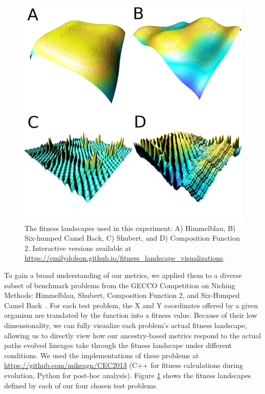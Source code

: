 \documentclass[letterpaper]{article}
\newcommand{\reduceCaptionPadding}{\setlength{\belowcaptionskip}{-10pt}}
\begin{document}
\begin{figure}
\includegraphics[width=\columnwidth]{figs/landscapes.png}
\reduceCaptionPadding
\caption{\small The fitness landscapes used in this experiment: A) Himmelblau, B) Six-humped Camel Back, C) Shubert, and D) Composition Function 2. Interactive versions available at \url{https://emilydolson.github.io/fitness_landscape_visualizations}.}
\label{fig:landscapes}
\end{figure}

To gain a broad understanding of our metrics, we applied them to a diverse subset of benchmark problems from the GECCO Competition on Niching Methods: Himmelblau, Shubert, Composition Function 2, and Six-Humped Camel Back~\citep{li_benchmark_2013}. For each test problem, the X and Y coordinates offered by a given organism are translated by the function into a fitness value. Because of their low dimensionality, we can fully visualize each problem's actual fitness landscape, allowing us to directly view how our ancestry-based metrics respond to the actual paths evolved lineages take through the fitness landscape under different conditions.
We used the implementations of these problems at \url{https://github.com/mikeagn/CEC2013} (C++ for fitness calculations during evolution, Python for post-hoc analysis). Figure \ref{fig:landscapes} shows the fitness landscapes defined by each of our four chosen test problems.
\end{document}
